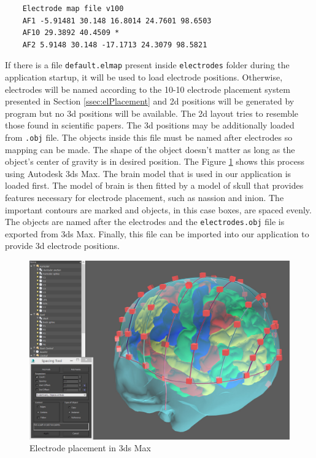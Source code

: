 \lstset{captionpos=b, caption=Electrode map file example, label=lst:ElMap}
\begin{lstlisting}
    Electrode map file v100
    AF1 -5.91481 30.148 16.8014 24.7601 98.6503
    AF10 29.3892 40.4509 *
    AF2 5.9148 30.148 -17.1713 24.3079 98.5821
\end{lstlisting}

If there is a file \texttt{default.elmap} present inside \texttt{electrodes} folder during the application startup, it will be used to load electrode positions. Otherwise, electrodes will be named according to the 10-10 electrode placement system presented in Section \ref{ssec:elPlacement} and \gls{2d} positions will be generated by program but no \gls{3d} positions will be available. The \gls{2d} layout tries to resemble those found in scientific papers. The \gls{3d} positions may be additionally loaded from \texttt{.obj} file. The objects inside this file must be named after electrodes so mapping can be made. The shape of the object doesn't matter as long as the object's center of gravity is in desired position. The Figure \ref{fig:3DSMaxPlacement} shows this process using Autodesk 3ds Max. The brain model that is used in our application is loaded first. The model of brain is then fitted by a model of skull that provides features necessary for electrode placement, such as nassion and inion. The important contours are marked and objects, in this case boxes, are spaced evenly. The objects are named after the electrodes and the \texttt{electrodes.obj} file is exported from 3ds Max. Finally, this file can be imported into our application to provide \gls{3d} electrode positions.

\begin{figure}[htb]
	\centering
	\includegraphics[width=1\linewidth]{fig/3DSMaxPlacement.jpg}
	\caption{Electrode placement in 3ds Max}
	\label{fig:3DSMaxPlacement}
\end{figure}

